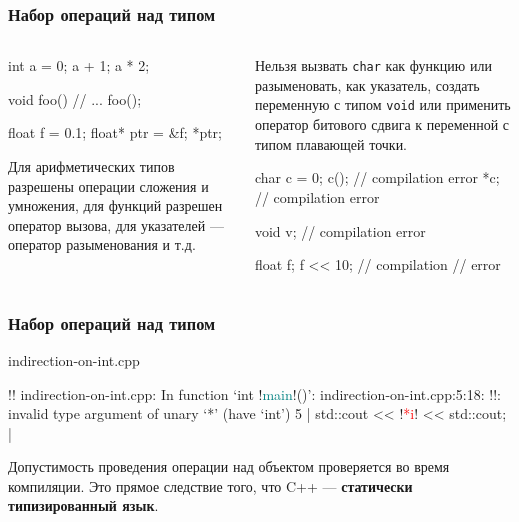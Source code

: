 \documentclass[compress, 8pt]{beamer}
\begin{document}
\begin{frame}[fragile]

    \frametitle{Набор операций над типом}

    \begin{columns}[T]

        \begin{column}{0.5\textwidth}

            \begin{myinplacelisting}[minted language=cpp]
int a = 0;
a + 1;
a * 2;

void foo() {}
// ...
foo();

float f = 0.1;
float* ptr = &f;
*ptr;
            \end{myinplacelisting}

            Для арифметических типов разрешены операции сложения
            и умножения, для функций разрешен оператор вызова,
            для указателей --- оператор разыменования и т.д.

        \end{column}

        \begin{column}{0.5\textwidth}

            Нельзя вызвать \verb|char| как функцию или разыменовать, как
            указатель, создать переменную с типом \verb|void| или
            применить оператор битового сдвига к переменной с типом
            плавающей точки.

            \begin{myinplacelisting}[minted language=cpp]
char c = 0;
c(); // compilation error
*c;  // compilation error

void v; // compilation error

float f;
f << 10; // compilation
         // error
            \end{myinplacelisting}

        \end{column}

    \end{columns}

\end{frame}

\begin{frame}[fragile]

    \frametitle{Набор операций над типом}

        {indirection-on-int.cpp}

    \begin{terminalwindow}
!!
indirection-on-int.cpp: In function ‘int !\textcolor{teal}{main}!()’:
indirection-on-int.cpp:5:18: !\color{red}{error}!: invalid type argument of unary ‘*’ (have ‘int’)
    5 |     std::cout << !\textcolor{red}{*i}! << std::cout;
      |
    \end{terminalwindow}

    Допустимость проведения операции над объектом проверяется во время
    компиляции. Это прямое следствие того, что C++ ---
    \textbf{статически типизированный язык}.

\end{frame}
\end{document}
